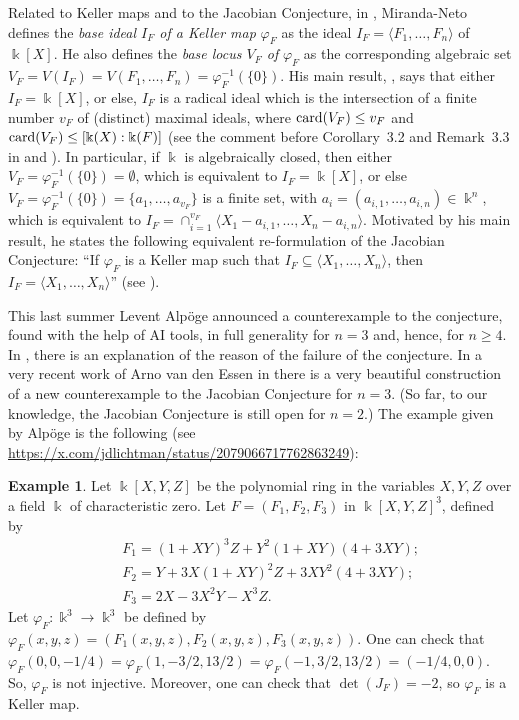 \documentclass[11pt,reqno]{amsart}
\theoremstyle{definition}
\newtheorem{example}[theorem]{Example}
\newcommand{\mbk}{\mbox{$\Bbbk$}}
\newcommand{\card}{\mbox{${\rm card}$}}
\begin{document}
Related to Keller maps and to the Jacobian Conjecture, in \cite{mn}, Miranda-Neto defines 
the \emph{base ideal $I_F$ of a Keller map} $\varphi_F$ 
as the ideal $I_F=\langle F_1,\ldots,F_n\rangle$ of $\mbk[X]$. He also defines the 
\emph{base locus $V_F$ of} $\varphi_F$ as the corresponding algebraic set $V_F=V(I_F)=V(F_1,\ldots,F_n)=\varphi_F^{-1}(\{0\})$. 
His main result, \cite[Theorem~3.1]{mn}, says that either $I_F=\mbk[X]$, or else, 
$I_F$ is a radical ideal which is the 
intersection of a finite number $v_F$ of (distinct) maximal ideals,
where $\card(V_F)\leq v_F$ and $\card(V_F)\leq [\mbk(X):\mbk(F)]$ (see
the comment before Corollary~3.2 and Remark~3.3 in \cite{mn} and 
\cite[Theorem~1.1.32]{vde1}).
In particular, if $\mbk$ is algebraically closed, then either $V_F=\varphi_F^{-1}(\{0\})=\emptyset$, which is equivalent to $I_F=\mbk[X]$, or else $V_F=\varphi_F^{-1}(\{0\})=\{a_1,\ldots,a_{v_F}\}$ is a finite set, with  $a_i=(a_{i,1},\ldots,a_{i,n})\in\mbk^n$, which is equivalent to $I_F=\cap_{i=1}^{v_F}\langle X_1-a_{i,1},\ldots,X_n-a_{i,n}\rangle$. 
Motivated by his main result, 
he states the following equivalent re-formulation of the Jacobian Conjecture:
``If $\varphi_F$ is a Keller map such that $I_F\subseteq \langle X_1,\ldots,X_n\rangle$, then 
$I_F=\langle X_1,\ldots,X_n\rangle$'' (see \cite[Conjecture C and Theorem~5.1]{mn}). 

This last summer Levent Alp\"oge \cite{alpoge} announced a counterexample to the conjecture, found with the help of AI tools, in full generality for $n=3$ and, hence, for $n\geq 4$. In \cite{ai}, there is an explanation of the reason of the failure of the conjecture. In a very recent work of Arno van den Essen in \cite{vde2} there is a very beautiful construction of a new counterexample to the Jacobian Conjecture for $n=3$. (So far, to our knowledge, the Jacobian Conjecture is still open for $n=2$.)
The example given by Alp\"oge is the following (see \url{https://x.com/jdlichtman/status/2079066717762863249}): 

\begin{example}\label{example:ccj}
Let $\mbk[X,Y,Z]$ be the polynomial ring in the variables $X,Y,Z$ over a field $\mbk$ of characteristic zero. Let $F=(F_1,F_2,F_3)$ in $\mbk[X,Y,Z]^3$, defined by
\begin{eqnarray*}
&&F_1=(1+XY)^3Z+Y^2(1+XY)(4+3XY);\\
&&F_2=Y+3X(1+XY)^2Z+3XY^2(4+3XY);\\ %
&&F_3=2X-3X^2Y-X^3Z.
\end{eqnarray*}
Let $\varphi_F:\mbk^3\to\mbk^3$ be defined by $\varphi_F(x,y,z)=(F_1(x,y,z),F_2(x,y,z),F_3(x,y,z))$. 
One can check that
$\varphi_F(0,0,-1/4)=\varphi_F(1, -3/2, 13/2)=\varphi_F(-1, 3/2, 13/2)=(-1/4,0,0)$.
So, $\varphi_F$ is not injective. Moreover, one can check that $\det(J_F)=-2$, so $\varphi_F$ is a Keller map.
\end{example}
\end{document}
